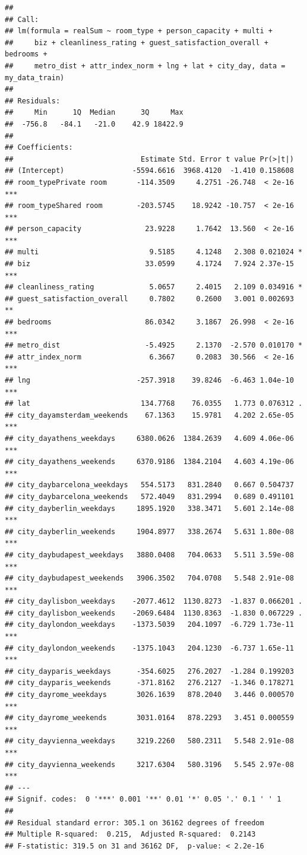 \documentclass[
]{article}
\begin{document}
\begin{verbatim}
## 
## Call:
## lm(formula = realSum ~ room_type + person_capacity + multi + 
##     biz + cleanliness_rating + guest_satisfaction_overall + bedrooms + 
##     metro_dist + attr_index_norm + lng + lat + city_day, data = my_data_train)
## 
## Residuals:
##     Min      1Q  Median      3Q     Max 
##  -756.8   -84.1   -21.0    42.9 18422.9 
## 
## Coefficients:
##                              Estimate Std. Error t value Pr(>|t|)    
## (Intercept)                -5594.6616  3968.4120  -1.410 0.158608    
## room_typePrivate room       -114.3509     4.2751 -26.748  < 2e-16 ***
## room_typeShared room        -203.5745    18.9242 -10.757  < 2e-16 ***
## person_capacity               23.9228     1.7642  13.560  < 2e-16 ***
## multi                          9.5185     4.1248   2.308 0.021024 *  
## biz                           33.0599     4.1724   7.924 2.37e-15 ***
## cleanliness_rating             5.0657     2.4015   2.109 0.034916 *  
## guest_satisfaction_overall     0.7802     0.2600   3.001 0.002693 ** 
## bedrooms                      86.0342     3.1867  26.998  < 2e-16 ***
## metro_dist                    -5.4925     2.1370  -2.570 0.010170 *  
## attr_index_norm                6.3667     0.2083  30.566  < 2e-16 ***
## lng                         -257.3918    39.8246  -6.463 1.04e-10 ***
## lat                          134.7768    76.0355   1.773 0.076312 .  
## city_dayamsterdam_weekends    67.1363    15.9781   4.202 2.65e-05 ***
## city_dayathens_weekdays     6380.0626  1384.2639   4.609 4.06e-06 ***
## city_dayathens_weekends     6370.9186  1384.2104   4.603 4.19e-06 ***
## city_daybarcelona_weekdays   554.5173   831.2840   0.667 0.504737    
## city_daybarcelona_weekends   572.4049   831.2994   0.689 0.491101    
## city_dayberlin_weekdays     1895.1920   338.3471   5.601 2.14e-08 ***
## city_dayberlin_weekends     1904.8977   338.2674   5.631 1.80e-08 ***
## city_daybudapest_weekdays   3880.0408   704.0633   5.511 3.59e-08 ***
## city_daybudapest_weekends   3906.3502   704.0708   5.548 2.91e-08 ***
## city_daylisbon_weekdays    -2077.4612  1130.8273  -1.837 0.066201 .  
## city_daylisbon_weekends    -2069.6484  1130.8363  -1.830 0.067229 .  
## city_daylondon_weekdays    -1373.5039   204.1097  -6.729 1.73e-11 ***
## city_daylondon_weekends    -1375.1043   204.1230  -6.737 1.65e-11 ***
## city_dayparis_weekdays      -354.6025   276.2027  -1.284 0.199203    
## city_dayparis_weekends      -371.8162   276.2127  -1.346 0.178271    
## city_dayrome_weekdays       3026.1639   878.2040   3.446 0.000570 ***
## city_dayrome_weekends       3031.0164   878.2293   3.451 0.000559 ***
## city_dayvienna_weekdays     3219.2260   580.2311   5.548 2.91e-08 ***
## city_dayvienna_weekends     3217.6304   580.3196   5.545 2.97e-08 ***
## ---
## Signif. codes:  0 '***' 0.001 '**' 0.01 '*' 0.05 '.' 0.1 ' ' 1
## 
## Residual standard error: 305.1 on 36162 degrees of freedom
## Multiple R-squared:  0.215,  Adjusted R-squared:  0.2143 
## F-statistic: 319.5 on 31 and 36162 DF,  p-value: < 2.2e-16
\end{verbatim}
\end{document}
